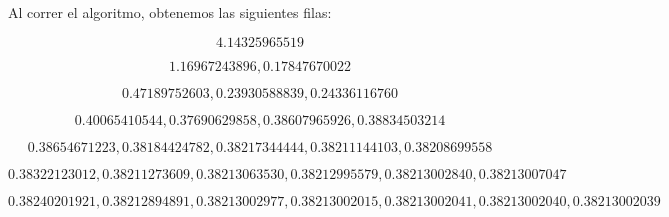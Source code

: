 
Al correr el algoritmo, obtenemos las siguientes filas:

\begin{dmath*}
4.14325965519
\end{dmath*}

\begin{dmath*}
1.16967243896, 0.17847670022
\end{dmath*}

\begin{dmath*}
0.47189752603, 0.23930588839, 0.24336116760
\end{dmath*}

\begin{dmath*}
0.40065410544, 0.37690629858, 0.38607965926, 0.38834503214
\end{dmath*}

\begin{dmath*}
0.38654671223, 0.38184424782, 0.38217344444, 0.38211144103, 0.38208699558
\end{dmath*}

\begin{dmath*}
0.38322123012, 0.38211273609, 0.38213063530, 0.38212995579, 0.38213002840, 0.38213007047
\end{dmath*}
	
\begin{dmath*}
0.38240201921, 0.38212894891, 0.38213002977, 0.38213002015, 0.38213002041, 0.38213002040, 0.38213002039
\end{dmath*}







